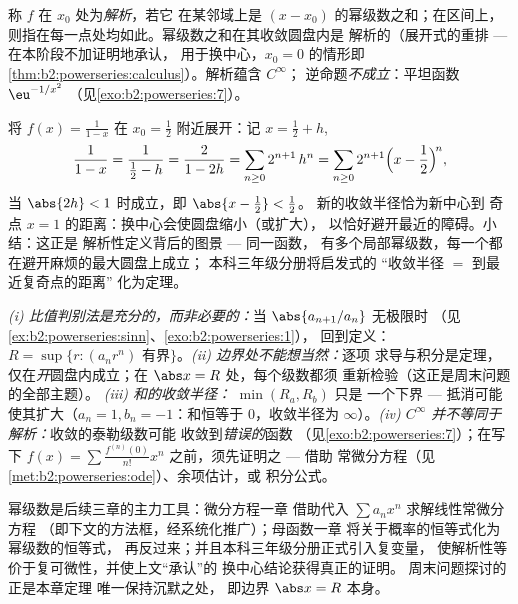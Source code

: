 \begin{definition}[解析函数]\label{def:b2:powerseries:analytic}
称 $f$ 在 $x_0$ 处为\emph{解析}，若它
在某邻域上是 $(x - x_0)$ 的幂级数之和；在区间上，
则指在每一点处均如此。幂级数之和在其收敛圆盘内是
解析的（展开式的重排 --- 在本阶段不加证明地承认，
用于换中心，$x_0 = 0$ 的情形即
\cref{thm:b2:powerseries:calculus}）。解析蕴含 $C^\infty$；
逆命题\emph{不成立}：平坦函数 $\eu^{-1/x^2}$
（见\cref{exo:b2:powerseries:7}）。
\end{definition}

\begin{example}\label{ex:b2:powerseries:recenter}
将 $f(x) = \frac{1}{1-x}$ 在 $x_0 = \frac12$ 附近展开：记
$x = \frac12 + h$,
\[
\frac{1}{1 - x} = \frac{1}{\frac12 - h}
= \frac{2}{1 - 2h}
= \sum_{n\geq0} 2^{n+1}\,h^n
= \sum_{n\geq0} 2^{n+1}\Bigl(x - \frac12\Bigr)^{\!n},
\]
当 $\abs{2h} < 1$ 时成立，即 $\abs{x - \frac12} < \frac12$。
新的收敛半径恰为新中心到
奇点 $x = 1$ 的距离：换中心会使圆盘缩小（或扩大），
以恰好避开最近的障碍。小结：这正是
解析性定义背后的图景 --- 同一函数，
有多个局部幂级数，每一个都在避开麻烦的最大圆盘上成立；
本科三年级分册将启发式的
“收敛半径 $=$ 到最近复奇点的距离”
化为定理。
\end{example}

\begin{remark}[常见误区]
\emph{(i) 比值判别法是充分的，而非必要的：}当
$\abs{a_{n+1}/a_n}$ 无极限时
（见\cref{ex:b2:powerseries:sinn}、\cref{exo:b2:powerseries:1}），
回到定义：$R = \sup\{r : (a_nr^n)$
有界$\}$。\emph{(ii) 边界处不能想当然：}逐项
求导与积分是定理，
仅在\emph{开}圆盘内成立；在 $\abs x = R$ 处，每个级数都须
重新检验（这正是周末问题的全部主题）。
\emph{(iii) 和的收敛半径：} $\min(R_a, R_b)$ 只是
一个下界 --- 抵消可能使其扩大（$a_n = 1,
b_n = -1$：和恒等于 $0$，收敛半径为 $\infty$）。\emph{(iv)
$C^\infty$ 并不等同于解析：}收敛的泰勒级数可能
收敛到\emph{错误的}函数
（见\cref{exo:b2:powerseries:7}）；在写下 $f(x) = \sum
\frac{f^{(n)}(0)}{n!}x^n$ 之前，须先证明之 --- 借助
常微分方程（见\cref{met:b2:powerseries:ode}）、余项估计，或
积分公式。
\end{remark}

\begin{remark}[应用]
幂级数是后续三章的主力工具：微分方程一章
借助代入 $\sum a_nx^n$ 求解线性常微分方程
（即下文的方法框，经系统化推广）；母函数一章
将关于概率的恒等式化为幂级数的恒等式，
再反过来；并且本科三年级分册正式引入复变量，
使解析性等价于复可微性，并使上文“承认”的
换中心结论获得真正的证明。
周末问题探讨的正是本章定理
唯一保持沉默之处，
即边界 $\abs x = R$ 本身。
\end{remark}

